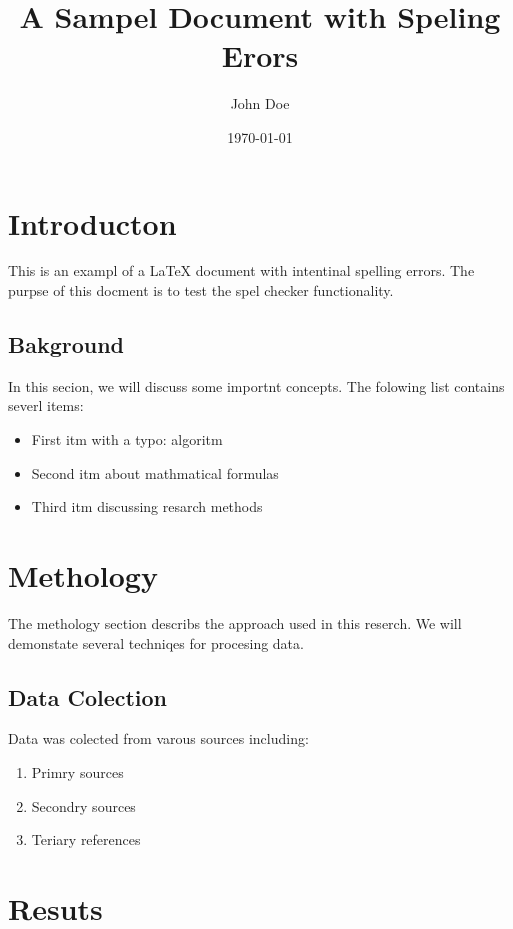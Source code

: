 \documentclass{article}
\title{A Sampel Document with Speling Erors}
\author{John Doe}
\date{\today}
\begin{document}
\maketitle


\section{Introducton}

This is an exampl of a LaTeX document with intentinal spelling errors.
The purpse of this docment is to test the spel checker functionality.

\subsection{Bakground}

In this secion, we will discuss some importnt concepts.
The folowing list contains severl items:

\begin{itemize}
    \item First itm with a typo: algoritm
    \item Second itm about mathmatical formulas
    \item Third itm discussing resarch methods
\end{itemize}

\section{Methology}

The methology section describs the approach used in this reserch.
We will demonstate several techniqes for procesing data.

\subsection{Data Colection}

Data was colected from varous sources including:
\begin{enumerate}
    \item Primry sources
    \item Secondry sources
    \item Teriary references
\end{enumerate}

\section{Resuts}
\end{document}
